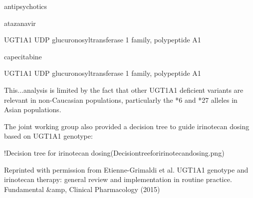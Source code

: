 \documentclass{resume} %
\begin{document}
\begin{rSection}{ antipsychotics }
\begin{rSection}{ atazanavir }
\begin{rSubsection}{ UGT1A1 }{ UDP glucuronosyltransferase 1 family, polypeptide A1 }{}{}
\begin{rSection}{ capecitabine }
\begin{rSubsection}{ UGT1A1 }{ UDP glucuronosyltransferase 1 family, polypeptide A1 }{}{}
 \newline
\item This...analysis is limited by the fact that other UGT1A1 deficient variants are relevant in non-Caucasian populations, particularly the *6 and *27 alleles in Asian populations.
 \newline
\item The joint working group also provided a decision tree to guide irinotecan dosing based on UGT1A1 genotype:
 \newline
\item !Decision tree for irinotecan dosing(Decisiontreeforirinotecandosing.png)
 \newline
\item Reprinted with permission from Etienne-Grimaldi et al. UGT1A1 genotype and irinotecan therapy: general review and implementation in routine practice. Fundamental &amp,  Clinical Pharmacology (2015) \newline
\vspace{1pt}\newline



\end{rSubsection}
\end{rSection}
\end{rSubsection}
\end{rSection}
\end{rSection}
\end{document}
